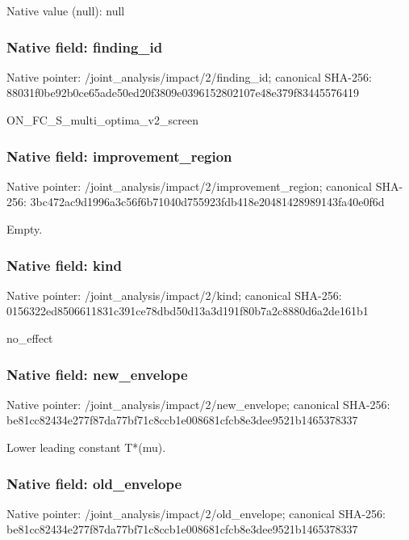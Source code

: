 \documentclass[10pt,a4paper]{article}
\begin{document}
Native value (null): null

\subsubsection{Native field: finding\_\allowbreak{}id}
Native pointer: /joint\_\allowbreak{}analysis/impact/2/finding\_\allowbreak{}id; canonical SHA-256: 88031f0be92b0ce65ade50ed20f3809e0396152802107e48e379f83445576419

\begingroup\raggedright\sloppy ON\_\allowbreak{}FC\_\allowbreak{}S\_\allowbreak{}multi\_\allowbreak{}optima\_\allowbreak{}v2\_\allowbreak{}screen\par\endgroup

\subsubsection{Native field: improvement\_\allowbreak{}region}
Native pointer: /joint\_\allowbreak{}analysis/impact/2/improvement\_\allowbreak{}region; canonical SHA-256: 3bc472ac9d1996a3c56f6b71040d755923fdb418e20481428989143fa40e0f6d

\begingroup\raggedright\sloppy Empty.\par\endgroup

\subsubsection{Native field: kind}
Native pointer: /joint\_\allowbreak{}analysis/impact/2/kind; canonical SHA-256: 0156322ed8506611831c391ce78dbd50d13a3d191f80b7a2c8880d6a2de161b1

\begingroup\raggedright\sloppy no\_\allowbreak{}effect\par\endgroup

\subsubsection{Native field: new\_\allowbreak{}envelope}
Native pointer: /joint\_\allowbreak{}analysis/impact/2/new\_\allowbreak{}envelope; canonical SHA-256: be81cc82434e277f87da77bf71c8ccb1e008681cfcb8e3dee9521b1465378337

\begingroup\raggedright\sloppy Lower leading constant T*(mu).\par\endgroup

\subsubsection{Native field: old\_\allowbreak{}envelope}
Native pointer: /joint\_\allowbreak{}analysis/impact/2/old\_\allowbreak{}envelope; canonical SHA-256: be81cc82434e277f87da77bf71c8ccb1e008681cfcb8e3dee9521b1465378337
\end{document}
